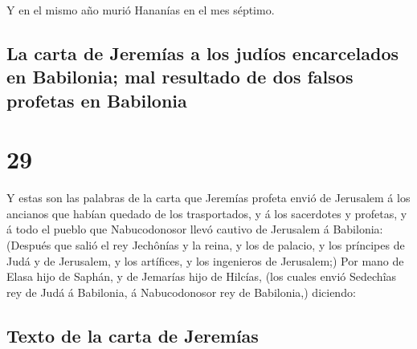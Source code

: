  Y en el mismo año murió Hananías en el mes séptimo.

\hypertarget{la-carta-de-jeremuxedas-a-los-juduxedos-encarcelados-en-babilonia-mal-resultado-de-dos-falsos-profetas-en-babilonia}{%
\subsection{La carta de Jeremías a los judíos encarcelados en Babilonia;
mal resultado de dos falsos profetas en
Babilonia}\label{la-carta-de-jeremuxedas-a-los-juduxedos-encarcelados-en-babilonia-mal-resultado-de-dos-falsos-profetas-en-babilonia}}

\hypertarget{section-28}{%
\section{29}\label{section-28}}

 Y estas son las palabras de la carta que Jeremías profeta
envió de Jerusalem á los ancianos que habían quedado de los
trasportados, y á los sacerdotes y profetas, y á todo el pueblo que
Nabucodonosor llevó cautivo de Jerusalem á Babilonia: 
(Después que salió el rey Jechônías y la reina, y los de palacio, y los
príncipes de Judá y de Jerusalem, y los artífices, y los ingenieros de
Jerusalem;)  Por mano de Elasa hijo de Saphán, y de Jemarías
hijo de Hilcías, (los cuales envió Sedechîas rey de Judá á Babilonia, á
Nabucodonosor rey de Babilonia,) diciendo:

\hypertarget{texto-de-la-carta-de-jeremuxedas}{%
\subsection{Texto de la carta de
Jeremías}\label{texto-de-la-carta-de-jeremuxedas}}


